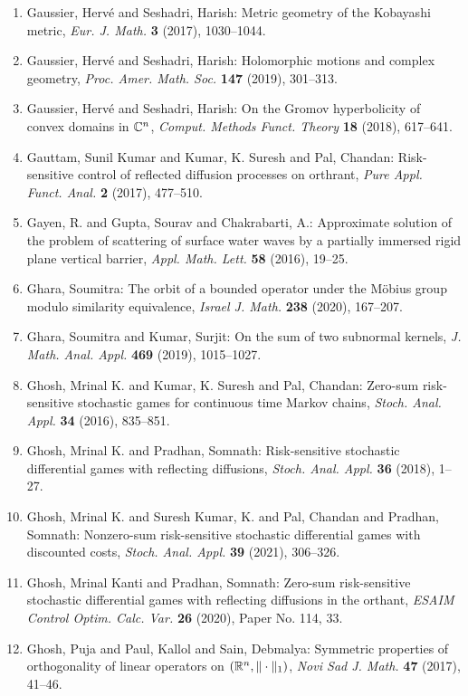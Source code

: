 \begin{enumerate}
\item Gaussier, Herv\'{e} and Seshadri, Harish: Metric geometry of the {K}obayashi metric, \emph{Eur. J. Math.} {\bf 3} (2017), 1030--1044.
\item Gaussier, Herv\'{e} and Seshadri, Harish: Holomorphic motions and complex geometry, \emph{Proc. Amer. Math. Soc.} {\bf 147} (2019), 301--313.
\item Gaussier, Herv\'{e} and Seshadri, Harish: On the {G}romov hyperbolicity of convex domains in {$\Bbb
C^n$}, \emph{Comput. Methods Funct. Theory} {\bf 18} (2018), 617--641.
\item Gauttam, Sunil Kumar and Kumar, K. Suresh and Pal, Chandan: Risk-sensitive control of reflected diffusion processes on
orthrant, \emph{Pure Appl. Funct. Anal.} {\bf 2} (2017), 477--510.
\item Gayen, R. and Gupta, Sourav and Chakrabarti, A.: Approximate solution of the problem of scattering of surface
water waves by a partially immersed rigid plane vertical
barrier, \emph{Appl. Math. Lett.} {\bf 58} (2016), 19--25.
\item Ghara, Soumitra: The orbit of a bounded operator under the {M}\"{o}bius group
modulo similarity equivalence, \emph{Israel J. Math.} {\bf 238} (2020), 167--207.
\item Ghara, Soumitra and Kumar, Surjit: On the sum of two subnormal kernels, \emph{J. Math. Anal. Appl.} {\bf 469} (2019), 1015--1027.
\item Ghosh, Mrinal K. and Kumar, K. Suresh and Pal, Chandan: Zero-sum risk-sensitive stochastic games for continuous time
{M}arkov chains, \emph{Stoch. Anal. Appl.} {\bf 34} (2016), 835--851.
\item Ghosh, Mrinal K. and Pradhan, Somnath: Risk-sensitive stochastic differential games with reflecting
diffusions, \emph{Stoch. Anal. Appl.} {\bf 36} (2018), 1--27.
\item Ghosh, Mrinal K. and Suresh Kumar, K. and Pal, Chandan and
Pradhan, Somnath: Nonzero-sum risk-sensitive stochastic differential games with
discounted costs, \emph{Stoch. Anal. Appl.} {\bf 39} (2021), 306--326.
\item Ghosh, Mrinal Kanti and Pradhan, Somnath: Zero-sum risk-sensitive stochastic differential games with
reflecting diffusions in the orthant, \emph{ESAIM Control Optim. Calc. Var.} {\bf 26} (2020), Paper No. 114, 33.
\item Ghosh, Puja and Paul, Kallol and Sain, Debmalya: Symmetric properties of orthogonality of linear operators on
{$(\Bbb R^n,\|\cdot\|_1)$}, \emph{Novi Sad J. Math.} {\bf 47} (2017), 41--46.

\end{enumerate}

